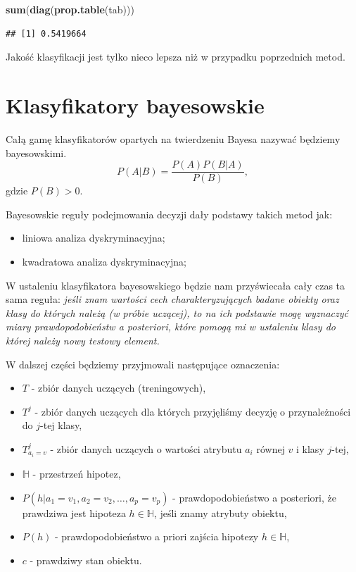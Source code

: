 \documentclass[]{book}
\newenvironment{Shaded}{\begin{snugshade}}{\end{snugshade}}
\newcommand{\KeywordTok}[1]{\textcolor[rgb]{0.13,0.29,0.53}{\textbf{#1}}}
\newcommand{\NormalTok}[1]{#1}
\providecommand{\tightlist}{%
  \setlength{\itemsep}{0pt}\setlength{\parskip}{0pt}}
\theoremstyle{plain}
\theoremstyle{definition}
\theoremstyle{definition}
\theoremstyle{definition}
\theoremstyle{definition}
\theoremstyle{remark}
\begin{document}
\begin{Shaded}
\begin{Highlighting}[]
\KeywordTok{sum}\NormalTok{(}\KeywordTok{diag}\NormalTok{(}\KeywordTok{prop.table}\NormalTok{(tab)))}
\end{Highlighting}
\end{Shaded}

\begin{verbatim}
## [1] 0.5419664
\end{verbatim}

Jakość klasyfikacji jest tylko nieco lepsza niż w przypadku poprzednich metod.

\hypertarget{bayes}{%
\chapter{Klasyfikatory bayesowskie}\label{bayes}}

Całą gamę klasyfikatorów opartych na twierdzeniu Bayesa nazywać będziemy bayesowskimi.
\begin{equation}\label{bayes}
        P(A|B)=\frac{P(A)P(B|A)}{P(B)},
\end{equation}
gdzie \(P(B)>0\).

Bayesowskie reguły podejmowania decyzji dały podstawy takich metod jak:

\begin{itemize}
\tightlist
\item
  liniowa analiza dyskryminacyjna;
\item
  kwadratowa analiza dyskryminacyjna;
\end{itemize}

W ustaleniu klasyfikatora bayesowskiego będzie nam przyświecała cały czas ta sama reguła: \emph{jeśli znam wartości cech charakteryzujących badane obiekty oraz klasy do których należą (w próbie uczącej), to na ich podstawie mogę wyznaczyć miary prawdopodobieństw a posteriori, które pomogą mi w ustaleniu klasy do której należy nowy testowy element.}

W dalszej części będziemy przyjmowali następujące oznaczenia:

\begin{itemize}
\tightlist
\item
  \(T\) - zbiór danych uczących (treningowych),
\item
  \(T^j\) - zbiór danych uczących dla których przyjęliśmy decyzję o przynależności do \(j\)-tej klasy,
\item
  \(T^j_{a_i=v}\) - zbiór danych uczących o wartości atrybutu \(a_i\) równej \(v\) i klasy \(j\)-tej,
\item
  \(\mathbb{H}\) - przestrzeń hipotez,
\item
  \(P(h|a_1=v_1, a_2=v_2,\ldots,a_p=v_p)\) - prawdopodobieństwo a posteriori, że prawdziwa jest hipoteza \(h\in \mathbb{H}\), jeśli znamy atrybuty obiektu,
\item
  \(P(h)\) - prawdopodobieństwo a priori zajścia hipotezy \(h\in \mathbb{H}\),
\item
  \(c\) - prawdziwy stan obiektu.
\end{itemize}
\end{document}
